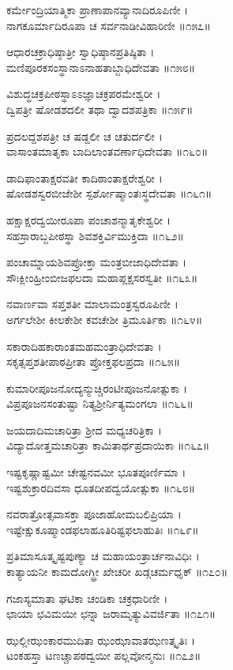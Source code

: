 ಕರ್ಮೇಂದ್ರಿಯಾತ್ಮಿಕಾ ಪ್ರಾಣಾಪಾನವ್ಯಾನಾದಿರೂಪಿಣೀ ।\\
ನಾಗಕೂರ್ಮಾದಿರೂಪಾ ಚ ಸರ್ವನಾಡೀವಿಹಾರಿಣೀ ॥೧೫೭॥

ಆಧಾರಚಕ್ರಾಧಿಷ್ಠಾತ್ರೀ ಸ್ವಾಧಿಷ್ಠಾನಪ್ರತಿಷ್ಠಿತಾ ।\\
ಮಣಿಪೂರಕಸಂಸ್ಥಾನಾಽನಾಹತಾಬ್ಜಾಧಿದೇವತಾ ॥೧೫೮॥

ವಿಶುದ್ಧಚಕ್ರಪೀಠಸ್ಥಾಽಽಜ್ಞಾಚಕ್ರಪರಮೇಶ್ವರೀ ।\\
ದ್ವಿಪತ್ರೀ ಷೋಡಶದಲೀ ತಥಾ ದ್ವಾದಶಪತ್ರಿಕಾ ॥೧೫೯॥

ಪ್ರದಲದ್ದಶಪತ್ರೀ ಚ ಷಡ್ದಲೀ ಚ ಚತುರ್ದಲೀ ।\\
ವಾಸಾಂತಮಾತೃಕಾ ಬಾದಿಲಾಂತವರ್ಣಾಧಿದೇವತಾ ॥೧೬೦॥

ಡಾದಿಫಾಂತಾಕ್ಷರವತೀ ಕಾದಿಠಾಂತಾಕ್ಷರೇಶ್ವರೀ ।\\
ಷೋಡಶಸ್ವರಬೀಜೇಶೀ ಸ್ಪರ್ಶೋಷ್ಮಾಂತಃಸ್ಥದೇವತಾ ॥೧೬೧॥

ಹಕ್ಷಾಕ್ಷರದ್ವಯೀರೂಪಾ ಪಂಚಾಶನ್ಮಾತೃಕೇಶ್ವರೀ ।\\
ಸಹಸ್ರಾರಾಬ್ಜಪೀಠಸ್ಥಾ ಶಿವಶಕ್ತಿರ್ವಿಮುಕ್ತಿದಾ ॥೧೬೨॥

ಪಂಚಾಮ್ನಾಯಶಿವಪ್ರೋಕ್ತಾ ಮಂತ್ರಬೀಜಾಧಿದೇವತಾ ।\\
ಸೌಃಕ್ಲೀಂಹ್ರೀಂಬೀಜಫಲದಾ ಮಹಾಪ್ಲಕ್ಷಸರಸ್ವತೀ ॥೧೬೩॥

ನವಾರ್ಣವಾ ಸಪ್ತಶತೀ ಮಾಲಾಮಂತ್ರಸ್ವರೂಪಿಣೀ ।\\
ಅರ್ಗಲೇಶೀ ಕೀಲಕೇಶೀ ಕವಚೇಶೀ ತ್ರಿಮೂರ್ತಿಕಾ ॥೧೬೪॥

ಸಕಾರಾದಿಹಕಾರಾಂತಮಹಮಂತ್ರಾಧಿದೇವತಾ ।\\
ಸಕೃತ್ಸಪ್ತಶತೀಪಾಠಪ್ರೀತಾ ಪ್ರೋಕ್ತಫಲಪ್ರದಾ ॥೧೬೫॥

ಕುಮಾರೀಪೂಜನೋದ್ಯನ್ಮುಚ್ಚಿರಂಟೀಪೂಜನೋತ್ಸುಕಾ ।\\
ವಿಪ್ರಪೂಜನಸಂತುಷ್ಟಾ ನಿತ್ಯಶ್ರೀರ್ನಿತ್ಯಮಂಗಲಾ ॥೧೬೬॥

ಜಯದಾದಿಮಚಾರಿತ್ರಾ ಶ್ರೀದ ಮಧ್ಯಚರಿತ್ರಿಕಾ ।\\
ವಿದ್ಯಾದೋತ್ತಮಚಾರಿತ್ರಾ ಕಾಮಿತಾರ್ಥಪ್ರದಾಯಿಕಾ ॥೧೬೭॥

ಇಷ್ಟಕೃಷ್ಣಾಷ್ಟಮೀ ಚೇಷ್ಟನವಮೀ ಭೂತಪೂರ್ಣಿಮಾ ।\\
ಇಷ್ಟಶುಕ್ರಾರದಿವಸಾ ಧೂತದೀಪದ್ವಯೋತ್ಸುಕಾ ॥೧೬೮॥

ನವರಾತ್ರೋತ್ಸವಾಸಕ್ತಾ ಪೂಜಾಹೋಮಬಲಿಪ್ರಿಯಾ ।\\
ಇಷ್ಟೇಕ್ಷುಕೂಷ್ಮಾಂಡಫಲಾಹೂತಿರಿಷ್ಟಫಲಾಹುತಿಃ ॥೧೬೯॥

ಪ್ರತಿಮಾಸೂತ್ಕೃಷ್ಟಪುಣ್ಯಾ ಚ ಮಹಾಯಂತ್ರಾರ್ಚನಾವಿಧಿಃ ।\\
ಕಾತ್ಯಾಯನೀ ಕಾಮದೋಗ್ಧ್ರೀ ಖೇಚರೀ ಖಡ್ಗಚರ್ಮಧೃಕ್ ॥೧೭೦॥

ಗಜಾಸ್ಯಮಾತಾ ಘಟಿಕಾ ಚಂಡಿಕಾ ಚಕ್ರಧಾರಿಣೀ ।\\
ಛಾಯಾ ಛವಿಮಯೀ ಛನ್ನಾ ಜರಾಮೃತ್ಯುವಿವರ್ಜಿತಾ ॥೧೭೧॥

ಝಲ್ಲೀಝಂಕಾರಮುದಿತಾ ಝಂಝಾವಾತಝಣತ್ಕೃತಿಃ ।\\
ಟಂಕಹಸ್ತಾ ಟಣಚ್ಚಾಪಠದ್ವಯೀ ಪಲ್ಲವೋನ್ಮನುಃ ॥೧೭೨॥

